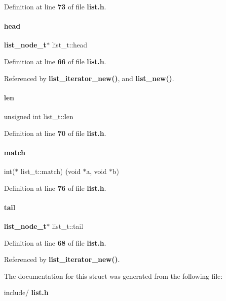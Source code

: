 Definition at line \textbf{ 73} of file \textbf{ list.\+h}.

\mbox{\label{structlist__t_a93ef6d995af96e73e226dc2b8a7232aa}} 
\paragraph{head}
{\footnotesize\ttfamily \textbf{ list\+\_\+node\+\_\+t}$\ast$ list\+\_\+t\+::head}



Definition at line \textbf{ 66} of file \textbf{ list.\+h}.



Referenced by \textbf{ list\+\_\+iterator\+\_\+new()}, and \textbf{ list\+\_\+new()}.

\mbox{\label{structlist__t_aba275113a143fe39c162f547c6792502}} 
\paragraph{len}
{\footnotesize\ttfamily unsigned int list\+\_\+t\+::len}



Definition at line \textbf{ 70} of file \textbf{ list.\+h}.

\mbox{\label{structlist__t_a3cf6cc60206869f52386f1f72e161839}} 
\paragraph{match}
{\footnotesize\ttfamily int($\ast$ list\+\_\+t\+::match) (void $\ast$a, void $\ast$b)}



Definition at line \textbf{ 76} of file \textbf{ list.\+h}.

\mbox{\label{structlist__t_a45dc80e38f8869f66e5d006117aae5f2}} 
\paragraph{tail}
{\footnotesize\ttfamily \textbf{ list\+\_\+node\+\_\+t}$\ast$ list\+\_\+t\+::tail}



Definition at line \textbf{ 68} of file \textbf{ list.\+h}.



Referenced by \textbf{ list\+\_\+iterator\+\_\+new()}.



The documentation for this struct was generated from the following file\+:\begin{DoxyCompactItemize}
\item 
include/\textbf{ list.\+h}\end{DoxyCompactItemize}

